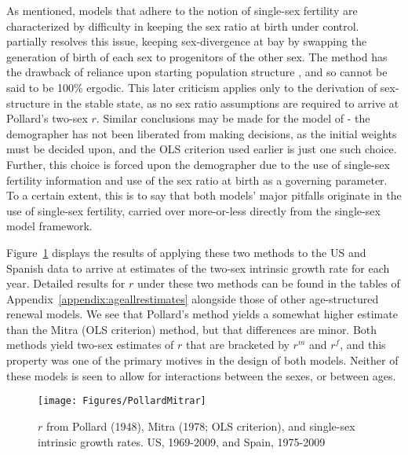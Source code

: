\FloatBarrier
As mentioned, models that adhere to the notion of single-sex fertility are
characterized by difficulty in keeping the sex ratio at birth under control.
\citet{pollard1948measurement} partially resolves this issue, keeping
sex-divergence at bay by swapping the generation of birth of each sex to
progenitors of the other sex. The method has the drawback of reliance upon
starting population structure \citep{yntema1952mathematical}, and so cannot be
said to be 100\% ergodic. This later criticism applies only to the derivation of
sex-structure in the stable state, as no sex ratio assumptions are required to arrive at Pollard's two-sex
$r$. Similar conclusions may be made for the model of
\citet{mitra1978derivation}- the demographer has not been liberated from making
decisions, as the initial weights must be decided upon, and the OLS criterion
used earlier is just one such choice. Further, this choice is forced upon the
demographer due to the use of single-sex fertility information and use of the
sex ratio at birth as a governing parameter. To a certain extent, this is to say
that both models' major pitfalls originate in the use of single-sex fertility,
carried over more-or-less directly from the single-sex model framework.

Figure~\ref{fig:PollardMitrar} displays the results of applying these two
methods to the US and Spanish data to arrive at estimates of the two-sex 
intrinsic growth rate for each year.  Detailed 
results for $r$ under these two methods can be found in the tables of
Appendix~\ref{appendix:ageallrestimates} alongside those of other
age-structured renewal models. We see that
Pollard's method yields a somewhat higher estimate than the Mitra (OLS
criterion) method, but that differences are minor. Both methods yield two-sex
estimates of $r$ that are bracketed by $r^m$ and $r^f$, and this property was
one of the primary motives in the design of both models. Neither of these models
is seen to allow for interactions between the sexes, or between ages.

\begin{figure}[ht!]
        \centering  
          \caption{$r$ from Pollard (1948), Mitra (1978; OLS criterion),
          and single-sex intrinsic growth rates. US, 1969-2009, and Spain, 1975-2009}
           \texttt{[image: Figures/PollardMitrar]}
          \label{fig:PollardMitrar}
\end{figure}

\FloatBarrier


